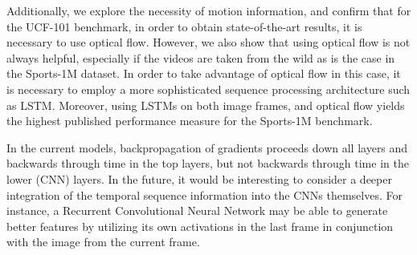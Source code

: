 \documentclass[10pt,twocolumn,letterpaper]{article}
\begin{document}
Additionally, we explore the necessity of motion information, and
confirm that for the UCF-101 benchmark, in order to obtain
state-of-the-art results, it is necessary to use optical
flow. However, we also show that using optical flow is not always
helpful, especially if the videos are taken from the wild as is the
case in the Sports-1M dataset. In order to take advantage of optical
flow in this case, it is necessary to employ a more sophisticated
sequence processing architecture such as LSTM. Moreover, using LSTMs
on both image frames, and optical flow yields the highest published
performance measure for the Sports-1M benchmark.

In the current models, backpropagation of gradients proceeds down
all layers and backwards through time in the top layers, but
not backwards through time in the lower (CNN) layers. In the future,
it would be interesting to consider a deeper integration of the temporal sequence information
 into the CNNs themselves. For instance, a Recurrent Convolutional Neural Network may
be able to generate better features by utilizing its own activations
in the last frame in conjunction with the image from the current
frame.

















 
{\small


}
\end{document}
